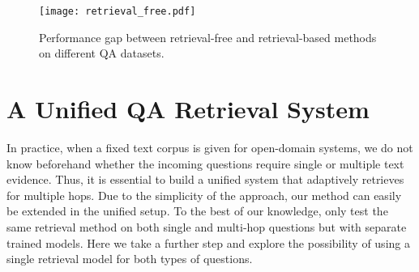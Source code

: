 \documentclass{article} \usepackage{iclr2021_conference,times}
\begin{document}
\begin{figure*}[h]
\centering
\texttt{[image: retrieval\_free.pdf]}
\vspace{-0.2in}
\caption{Performance gap between retrieval-free and retrieval-based methods on different QA datasets.}
\label{fig:retrieval_free}
\end{figure*}



\section{A Unified QA Retrieval System}

In practice, when a fixed text corpus is given for open-domain systems, we do not know beforehand whether the incoming questions require single or multiple text evidence. Thus, it is essential to build a unified system that adaptively retrieves for multiple hops. Due to the simplicity of the approach, our method can easily be extended in the unified setup. To the best of our knowledge, only \citep{GraphRecurrentRetriever} test the same retrieval method on both single and multi-hop questions but with separate trained models. Here we take a further step and explore the possibility of using a single retrieval model for both types of questions.
 
\end{document}
